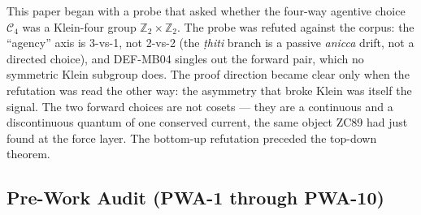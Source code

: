 \documentclass[12pt, a4paper]{article}
\begin{document}
\begin{derivedbox}[title={Discovery Note}]
This paper began with a probe that asked whether the four-way agentive
choice $\mathcal{C}_4$ was a Klein-four group $\mathbb{Z}_2\times\mathbb{Z}_2$. The
probe was refuted against the corpus: the ``agency'' axis is 3-vs-1, not
2-vs-2 (the \emph{ṭhiti} branch is a passive \emph{anicca} drift, not a
directed choice), and DEF-MB04 singles out the forward pair, which no
symmetric Klein subgroup does. The proof direction became clear only when
the refutation was read the other way: the asymmetry that broke Klein was
itself the signal. The two forward choices are not cosets --- they are a
continuous and a discontinuous quantum of one conserved current, the same
object ZC89 had just found at the force layer. The bottom-up refutation
preceded the top-down theorem.
\end{derivedbox}

\subsection{Pre-Work Audit (PWA-1 through PWA-10)}
\end{document}
